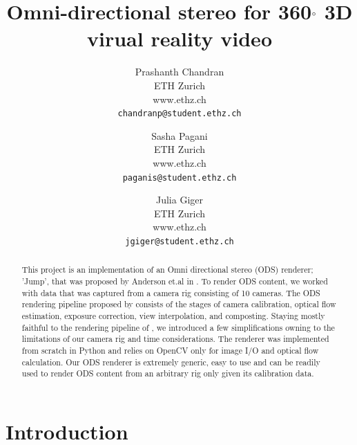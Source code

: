 \documentclass[10pt,twocolumn,letterpaper]{article}
\begin{document}
\title{Omni-directional stereo for 360$\degree$ 3D virual reality video}

\author{Prashanth Chandran\\
ETH Zurich\\
www.ethz.ch\\
{\tt\small chandranp@student.ethz.ch}
\and
Sasha Pagani\\
ETH Zurich\\
www.ethz.ch\\
{\tt\small paganis@student.ethz.ch}
\and
Julia Giger\\
ETH Zurich\\
www.ethz.ch\\
{\tt\small jgiger@student.ethz.ch}
}

\maketitle

\begin{abstract}
   This project is an implementation of an Omni directional stereo (ODS) renderer; 'Jump', that was proposed by Anderson et.al in \cite{jump16}.  To render ODS content, we worked with data that was captured from a camera rig consisting of 10 cameras. The ODS rendering pipeline proposed by  \cite{jump16} consists of the stages of camera calibration, optical flow estimation, exposure correction, view interpolation, and composting. Staying mostly faithful to the rendering pipeline of \cite{jump16}, we introduced a few simplifications owning to the limitations of our camera rig and time considerations. The renderer was implemented from scratch in Python and relies on OpenCV only for image I/O and optical flow calculation. Our ODS renderer is extremely generic, easy to use and can be readily used to render ODS content from an arbitrary rig only given its calibration data. 
\end{abstract}

\section{Introduction}
\end{document}

